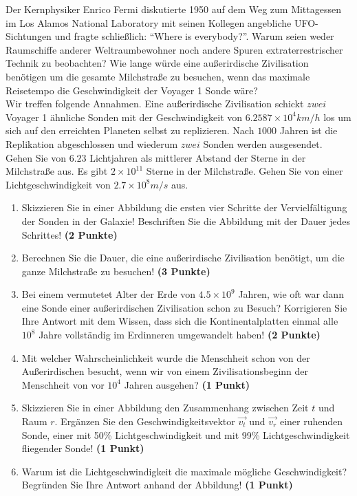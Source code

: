 \documentclass[a4paper, 10pt]{scrartcl}\usepackage[]{graphicx}\usepackage[]{xcolor}
\begin{document}
Der Kernphysiker Enrico Fermi diskutierte 1950 auf dem Weg zum Mittagessen
im Los Alamos National Laboratory mit seinen Kollegen angebliche
UFO-Sichtungen und fragte schlie{\ss}lich: "`Where is everybody?"'. Warum seien
weder Raumschiffe anderer Weltraumbewohner noch andere Spuren
extraterrestrischer Technik zu beobachten? Wie lange w{\"u}rde eine au{\ss}erirdische
Zivilisation ben{\"o}tigen um die gesamte Milchstra{\ss}e zu
besuchen, wenn das maximale Reisetempo die Geschwindigkeit der Voyager 1 Sonde w{\"a}re?\\[-1ex]

Wir treffen folgende Annahmen. Eine au{\ss}erirdische Zivilisation schickt $zwei$
Voyager 1 {\"a}hnliche Sonden mit der Geschwindigkeit von $\ensuremath{6.2587\times 10^{4}}km/h$
los um sich auf den erreichten Planeten selbst zu replizieren. Nach
$1000$ Jahren ist die Replikation abgeschlossen und wiederum
$zwei$ Sonden werden ausgesendet. Gehen Sie von
$6.23$ Lichtjahren als mittlerer Abstand der Sterne in der
Milchstra{\ss}e aus. Es gibt $\ensuremath{2\times 10^{11}}$ Sterne in der Milchstra{\ss}e. Gehen
Sie von einer Lichtgeschwindigkeit von $\ensuremath{2.7\times 10^{8}}m/s$ aus.

\begin{enumerate}
\item Skizzieren Sie in einer Abbildung die ersten vier Schritte der
  Vervielf{\"a}ltigung der Sonden in der Galaxie! Beschriften Sie die Abbildung
  mit der Dauer jedes Schrittes! \textbf{(2 Punkte)}
\item Berechnen Sie die Dauer, die eine au{\ss}erirdische Zivilisation
  ben{\"o}tigt, um die ganze Milchstra{\ss}e zu besuchen! \textbf{(3 Punkte)}
\item Bei einem vermutetet Alter der Erde von $\ensuremath{4.5\times 10^{9}}$ Jahren,
  wie oft war dann eine Sonde einer au{\ss}erirdischen Zivilisation schon zu
  Besuch? Korrigieren Sie Ihre Antwort mit dem Wissen, dass sich die
  Kontinentalplatten einmal alle $\ensuremath{10^{8}}$ Jahre vollst{\"a}ndig im
  Erdinneren umgewandelt haben! \textbf{(2 Punkte)}
\item Mit welcher Wahrscheinlichkeit wurde die Menschheit schon von der
  Au{\ss}erirdischen besucht, wenn wir von einem Zivilisationsbeginn der
  Menschheit von vor $\ensuremath{10^{4}}$ Jahren ausgehen? \textbf{(1 Punkt)}
\item Skizzieren Sie in einer Abbildung den Zusammenhang zwischen Zeit $t$
  und Raum $r$. Erg{\"a}nzen Sie den Geschwindigkeitsvektor $\vec{v_t}$ und
  $\vec{v_r}$ einer ruhenden Sonde, einer mit 50\% Lichtgeschwindigkeit und
  mit 99\% Lichtgeschwindigkeit fliegender Sonde! \textbf{(1 Punkt)}
\item Warum ist die Lichtgeschwindigkeit die maximale m{\"o}gliche Geschwindigkeit?
Begr{\"u}nden Sie Ihre Antwort anhand der Abbildung!  \textbf{(1 Punkt)}
\end{enumerate}
\end{document}
